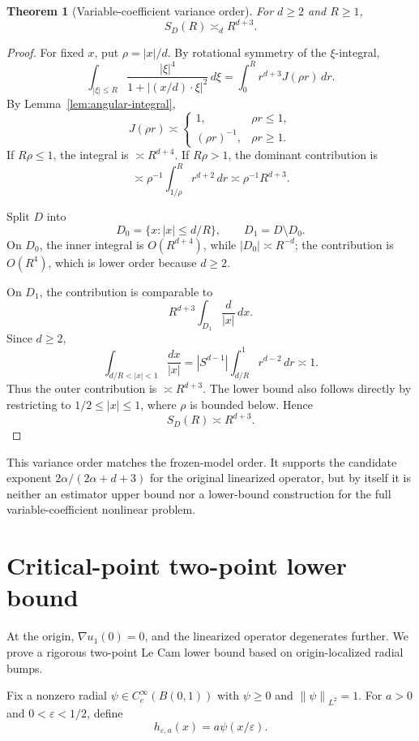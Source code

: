 \documentclass[12pt]{article}
\newtheorem{theorem}{Theorem}[section]
\theoremstyle{remark}
\newcommand{\norm}[1]{\left\lVert #1\right\rVert}
\newcommand{\asym}{\asymp}
\begin{document}
\begin{theorem}[Variable-coefficient variance order]
\label{thm:phase-space-variance}
For \(d\ge2\) and \(R\ge1\),
\[
S_D(R)\asym_d R^{d+3}.
\]
\end{theorem}
\begin{proof}
For fixed \(x\), put \(\rho=|x|/d\). By rotational symmetry of the \(\xi\)-integral,
\[
\int_{|\xi|\le R}
\frac{|\xi|^4}{1+|(x/d)\cdot\xi|^2}\,d\xi
=
\int_0^R r^{d+3}J(\rho r)\,dr.
\]
By Lemma~\ref{lem:angular-integral},
\[
J(\rho r)\asym
\begin{cases}
1, & \rho r\le1,\\
(\rho r)^{-1}, & \rho r\ge1.
\end{cases}
\]
If \(R\rho\le1\), the integral is \(\asym R^{d+4}\). If \(R\rho>1\), the dominant contribution is
\[
\asym
\rho^{-1}\int_{1/\rho}^R r^{d+2}\,dr
\asym
\rho^{-1}R^{d+3}.
\]

Split \(D\) into
\[
D_0=\{x: |x|\le d/R\},
\qquad
D_1=D\setminus D_0.
\]
On \(D_0\), the inner integral is \(O(R^{d+4})\), while \(|D_0|\asym R^{-d}\); the contribution is \(O(R^4)\), which is lower order because \(d\ge2\).

On \(D_1\), the contribution is comparable to
\[
R^{d+3}\int_{D_1}\frac{d}{|x|}\,dx.
\]
Since \(d\ge2\),
\[
\int_{d/R<|x|<1}\frac{dx}{|x|}
=
|S^{d-1}|\int_{d/R}^1 r^{d-2}\,dr
\asym1.
\]
Thus the outer contribution is \(\asym R^{d+3}\). The lower bound also follows directly by restricting to \(1/2\le|x|\le1\), where \(\rho\) is bounded below. Hence
\[
S_D(R)\asym R^{d+3}.
\]
\end{proof}

This variance order matches the frozen-model order. It supports the candidate exponent \(2\alpha/(2\alpha+d+3)\) for the original linearized operator, but by itself it is neither an estimator upper bound nor a lower-bound construction for the full variable-coefficient nonlinear problem.

\section{Critical-point two-point lower bound}
\label{sec:critical}

At the origin, \(\nabla u_1(0)=0\), and the linearized operator degenerates further. We prove a rigorous two-point Le Cam lower bound based on origin-localized radial bumps.

Fix a nonzero radial \(\psi\in C_c^\infty(B(0,1))\) with \(\psi\ge0\) and \(\norm{\psi}_{L^2}=1\). For \(a>0\) and \(0<\varepsilon<1/2\), define
\[
h_{\varepsilon,a}(x)=a\psi(x/\varepsilon).
\]
\end{document}
